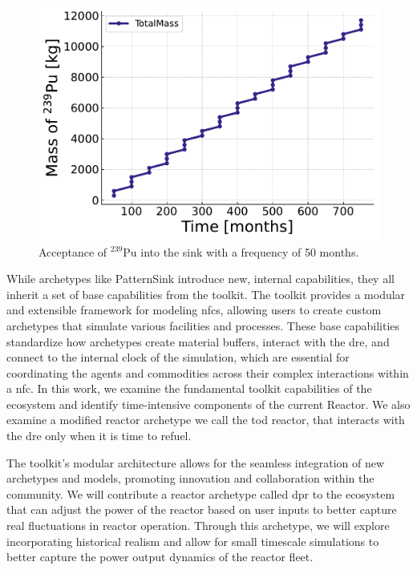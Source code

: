 \begin{figure}[H]
    \centering
    \includegraphics[scale=0.7]{images/cyclus/pattern_sink_fuel_transactions.pdf}
    \caption{Acceptance of $^{239}$Pu into the sink with a frequency of 50 months.}
    \label{fig:pattern_freq_50}
\end{figure}

While archetypes like PatternSink introduce new, internal capabilities, they
all inherit a set of base capabilities from the \cyclus toolkit. The \cyclus
toolkit provides a modular and extensible framework for modeling \glspl{nfc},
allowing users to create custom archetypes that simulate various facilities and
processes. These base capabilities standardize how archetypes create material
buffers, interact with the \gls{dre}, and connect to the internal clock of the
simulation, which are essential for coordinating the agents and commodities
across their complex interactions within a \gls{nfc}. In this work, we examine
the fundamental toolkit capabilities of the \cyclus ecosystem and identify
time-intensive components of the current \cycamore Reactor. We also examine a
modified reactor archetype we call the \gls{tod} reactor, that interacts with
the \gls{dre} only when it is time to refuel.

The toolkit's modular architecture allows for the seamless integration of new
archetypes and models, promoting innovation and collaboration within the
\cyclus community. We will contribute a reactor archetype called \gls{dpr} to
the ecosystem that can adjust the power of the reactor based on user inputs to
better capture real fluctuations in reactor operation. Through this archetype,
we will explore incorporating historical realism and allow for small timescale
simulations to better capture the power output dynamics of the reactor fleet.

